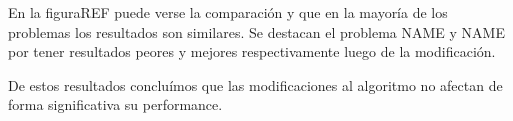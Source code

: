 En la figura{REF} puede verse la comparación y que en la mayoría de los problemas los resultados son similares. Se destacan el problema {NAME} y {NAME} por tener resultados peores y mejores respectivamente luego de la modificación.

De estos resultados concluímos que las modificaciones al algoritmo no afectan de forma significativa su performance.












